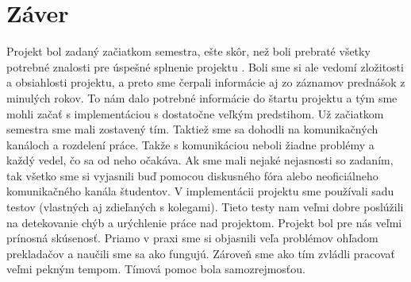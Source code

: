 \documentclass[a4paper, 11pt]{article}
\begin{document}
    \section{Záver}
    Projekt bol zadaný začiatkom semestra, ešte skôr, než boli prebraté všetky potrebné znalosti pre
    úspešné splnenie projektu . Boli sme si ale vedomí zložitosti a obsiahlosti projektu,
    a preto sme čerpali informácie aj zo záznamov prednášok z minulých rokov. To nám dalo potrebné informácie do
    štartu projektu a tým sme mohli začať s implementáciou s dostatočne veľkým predstihom.
    Už začiatkom semestra sme mali zostavený tím. Taktiež sme sa dohodli na komunikačných kanáloch a rozdelení práce. Takže s
    komunikáciou neboli žiadne problémy a každý vedel, čo sa od neho očakáva.
    Ak sme mali nejaké nejasnosti so zadaním, tak všetko sme si vyjasnili buď pomocou diskusného fóra alebo
    neoficiálneho komunikačného kanála študentov. V implementácii projektu sme používali sadu testov
    (vlastných aj zdieľaných s kolegami).
    Tieto testy nam veľmi dobre poslúžili na detekovanie chýb a urýchlenie práce nad projektom.
    Projekt bol pre nás veľmi prínosná skúsenosť. Priamo v praxi sme si objasnili veľa problémov ohľadom prekladačov a naučili sme sa ako fungujú.
    Zároveň sme ako tím zvládli pracovať veľmi pekným tempom. Tímová pomoc bola samozrejmosťou.



    \clearpage
    
    \renewcommand{\refname}{Literatura}
    



    \clearpage


\end{document}
